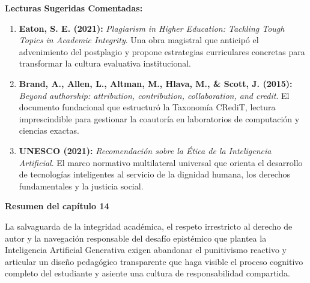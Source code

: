 \textbf{Lecturas Sugeridas Comentadas:}\\[0.2cm]
\begin{enumerate}
    \item \textbf{Eaton, S. E. (2021):} \textit{Plagiarism in Higher Education: Tackling Tough Topics in Academic Integrity}. Una obra magistral que anticipó el advenimiento del postplagio y propone estrategias curriculares concretas para transformar la cultura evaluativa institucional.
    \item \textbf{Brand, A., Allen, L., Altman, M., Hlava, M., \& Scott, J. (2015):} \textit{Beyond authorship: attribution, contribution, collaboration, and credit}. El documento fundacional que estructuró la Taxonomía CRediT, lectura imprescindible para gestionar la coautoría en laboratorios de computación y ciencias exactas.
    \item \textbf{UNESCO (2021):} \textit{Recomendación sobre la Ética de la Inteligencia Artificial}. El marco normativo multilateral universal que orienta el desarrollo de tecnologías inteligentes al servicio de la dignidad humana, los derechos fundamentales y la justicia social.
\end{enumerate}

\newpage
{}
\vspace*{0.6cm}
{\Huge \textbf{Resumen del capítulo 14}}
\vspace{0.5cm}

La salvaguarda de la integridad académica, el respeto irrestricto al derecho de autor y la navegación responsable del desafío epistémico que plantea la Inteligencia Artificial Generativa exigen abandonar el punitivismo reactivo y articular un diseño pedagógico transparente que haga visible el proceso cognitivo completo del estudiante y asiente una cultura de responsabilidad compartida.

\vspace{0.3cm}


